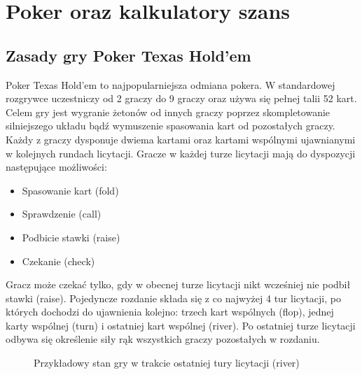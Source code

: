 \chapter{Poker oraz kalkulatory szans}
\label{chapter:2}

\section{Zasady gry Poker Texas Hold’em}

Poker Texas Hold’em \cite{wiki-texas-holdem} to najpopularniejsza odmiana pokera. W standardowej rozgrywce uczestniczy od 2 graczy do 9 graczy oraz używa się pełnej talii 52 kart. Celem gry jest wygranie żetonów od innych graczy poprzez skompletowanie silniejszego układu bądź wymuszenie spasowania kart od pozostałych graczy. Każdy z graczy dysponuje dwiema kartami oraz kartami wspólnymi ujawnianymi w kolejnych rundach licytacji. Gracze w każdej turze licytacji mają do dyspozycji następujące możliwości:

\begin{itemize}
    \item Spasowanie kart (fold)
    \item Sprawdzenie (call)
    \item Podbicie stawki (raise)
    \item Czekanie (check)
\end{itemize}

Gracz może czekać tylko, gdy w obecnej turze licytacji nikt wcześniej nie podbił stawki (raise). Pojedyncze rozdanie składa się z co najwyżej 4 tur licytacji, po których dochodzi do ujawnienia kolejno: trzech kart wspólnych (flop), jednej karty wspólnej (turn) i ostatniej kart wspólnej (river). Po ostatniej turze licytacji odbywa się określenie siły rąk wszystkich graczy pozostałych w rozdaniu.

\begin{figure}[ht]
    \caption{Przykładowy stan gry w trakcie ostatniej tury licytacji (river)}
    \label{fig:example-hand}
\end{figure}


